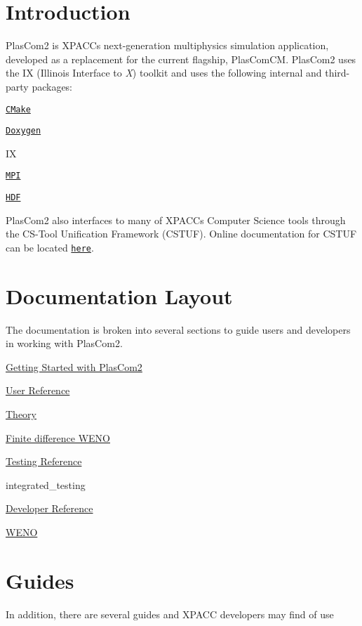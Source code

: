 \hypertarget{index_plascom2_intro}{}\section{Introduction}\label{index_plascom2_intro}
Plas\+Com2 is X\+P\+A\+CC\textquotesingle{}s next-\/generation multiphysics simulation application, developed as a replacement for the current flagship, Plas\+Com\+CM. Plas\+Com2 uses the IX (Illinois Interface to {\itshape X}) toolkit and uses the following internal and third-\/party packages\+:
\begin{DoxyItemize}
\item \href{http://www.cmake.org}{\tt C\+Make}
\item \href{http://www.stack.nl/~dimitri/doxygen/}{\tt Doxygen}
\item IX
\item \href{http://www.mcs.anl.gov/research/projects/mpi/}{\tt M\+PI}
\item \href{http://www.hdfgroup.org}{\tt H\+DF}
\end{DoxyItemize}

Plas\+Com2 also interfaces to many of X\+P\+A\+CC\textquotesingle{}s Computer Science tools through the C\+S-\/\+Tool Unification Framework (C\+S\+T\+UF). Online documentation for C\+S\+T\+UF can be located \href{https://xpacc-dev.bitbucket.io/CSTUF}{\tt here}.\hypertarget{index_layout}{}\section{Documentation Layout}\label{index_layout}
The documentation is broken into several sections to guide users and developers in working with Plas\+Com2.


\begin{DoxyItemize}
\item \hyperlink{getting_started}{Getting Started with Plas\+Com2}
\item \hyperlink{user_reference}{User Reference}
\item \hyperlink{theory}{Theory}
\item \hyperlink{weno_numerics}{Finite difference W\+E\+NO}
\item \hyperlink{testing_reference}{Testing Reference}
\item integrated\+\_\+testing
\item \hyperlink{developer_reference}{Developer Reference}
\item \hyperlink{weno}{W\+E\+NO}
\end{DoxyItemize}\hypertarget{index_xpacc_guides}{}\section{Guides}\label{index_xpacc_guides}
In addition, there are several guides and X\+P\+A\+CC developers may find of use


